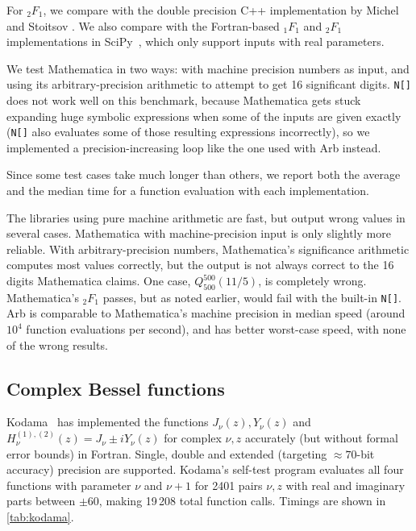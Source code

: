 \documentclass[11pt,a4paper]{article}
\begin{document}
For ${}_2F_1$, we compare with the double precision C++ implementation
by Michel and Stoitsov \cite{michel2008fast}.
We also compare with the Fortran-based ${}_1F_1$ and ${}_2F_1$ implementations in
SciPy~\cite{scipy}, which only support inputs with real parameters.

We test Mathematica in two ways: with machine precision numbers as input,
and using its arbitrary-precision arithmetic to attempt to get 16 significant digits.
\texttt{N[]} does not work well
on this benchmark, because Mathematica gets stuck expanding huge symbolic
expressions when some of the inputs are given exactly (\texttt{N[]}
also evaluates some of those resulting expressions incorrectly),
so we implemented a precision-increasing loop like the one used
with Arb instead.

Since some test cases take much longer than others,
we report both the average and the median time for a function
evaluation with each implementation.

The libraries using pure machine arithmetic are fast, but
output wrong values in several cases.
Mathematica with machine-precision input is only slightly more reliable.
With arbitrary-precision numbers, Mathematica's significance arithmetic
computes most values correctly, but the output is not always correct
to the 16 digits Mathematica claims. One case,
$Q_{500}^{500}(11/5)$, is completely wrong.
Mathematica's ${}_2F_1$ passes,
but as noted earlier, would fail with the built-in \texttt{N[]}.
Arb is comparable to Mathematica's machine precision in
median speed (around $10^4$ function evaluations per second),
and has better worst-case speed,
with none of the wrong results.

\subsection{Complex Bessel functions}

Kodama~\cite{Kodama2011} has implemented the functions $J_{\nu}(z), Y_{\nu}(z)$ and
$H^{(1),(2)}_{\nu}(z) = J_{\nu} \pm i Y_{\nu}(z)$ for complex $\nu, z$
accurately (but without formal error bounds) in Fortran.
Single, double and extended (targeting $\approx 70$-bit accuracy) precision are supported.
Kodama's self-test program evaluates all four functions
with parameter $\nu$ and $\nu + 1$ for 2401 pairs $\nu,z$ with real
and imaginary parts between $\pm 60$, making
19\,208 total function calls. Timings are shown in \cref{tab:kodama}.
\end{document}

